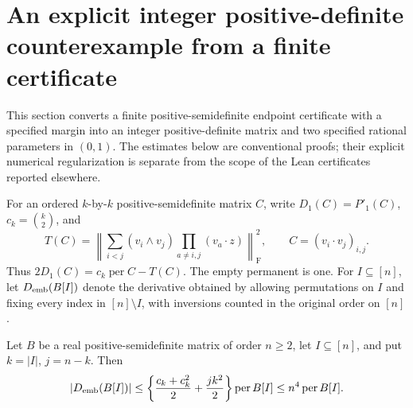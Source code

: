 \providecommand{\per}{\operatorname{per}}

\section{An explicit integer positive-definite counterexample from a finite certificate}
\label{fr:section}

This section converts a finite positive-semidefinite endpoint certificate
with a specified margin into an integer positive-definite matrix and
two specified rational parameters in \((0,1)\). The estimates below are
conventional proofs; their explicit numerical regularization is separate
from the scope of the Lean certificates reported elsewhere.

For an ordered \(k\)-by-\(k\) positive-semidefinite matrix \(C\), write
\(D_1(C)=P'_1(C)\), \(c_k=\binom{k}{2}\), and
\[
 T(C)=\left\|\sum_{i<j}(v_i\wedge v_j)
                    \prod_{a\ne i,j}(v_a\cdot z)\right\|_{\mathrm F}^2,
 \qquad C=(v_i\cdot v_j)_{i,j}.
\]
Thus \(2D_1(C)=c_k\per C-T(C)\). The empty permanent is one.
For \(I\subseteq[n]\), let \(D_{\rm emb}(B[I])\) denote the derivative
obtained by allowing permutations on \(I\) and fixing every index in
\([n]\setminus I\), with inversions counted in the original order on
\([n]\).

\begin{lemma}
\label{fr:embedded-bound}
Let \(B\) be a real positive-semidefinite matrix of order \(n\ge2\),
let \(I\subseteq[n]\), and put \(k=|I|\), \(j=n-k\). Then
\begin{equation}\label{fr:embedded-estimate}
 |D_{\rm emb}(B[I])|
 \le \left\{\frac{c_k+c_k^2}{2}+\frac{jk^2}{2}\right\}\per B[I]
 \le n^4\per B[I].
\end{equation}
\end{lemma}

